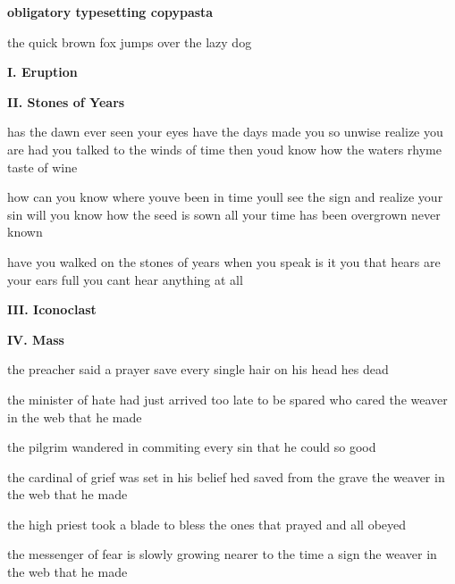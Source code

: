 \documentclass{article}
\renewcommand{\part}[1]{
  \begin{center}
    \textbf{#1}
  \end{center}
  \fontcream
}
\begin{document}
\noindent

\part{obligatory typesetting copypasta}

the quick brown fox jumps over the lazy dog

\part{I. Eruption}

\part{II. Stones of Years}

has the dawn ever seen your eyes
have the days made you so unwise
realize you are
had you talked to the winds of time
then youd know how the waters rhyme
taste of wine

how can you know where youve been
in time youll see the sign
and realize your sin
will you know how the seed is sown
all your time has been overgrown
never known

have you walked on the stones of years
when you speak is it you that hears
are your ears full
you cant hear anything at all

\part{III. Iconoclast}

\part{IV. Mass}

the preacher said a prayer
save every single hair on his head
hes dead

the minister of hate had just arrived too late to be spared
who cared
the weaver in the web that he made

the pilgrim wandered in
commiting every sin that he could
so good

the cardinal of grief was set in his belief hed saved
from the grave
the weaver in the web that he made

the high priest took a blade
to bless the ones that prayed
and all obeyed

the messenger of fear is slowly growing nearer to the time
a sign
the weaver in the web that he made
\end{document}
